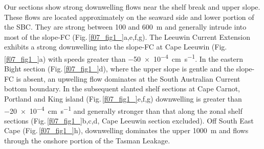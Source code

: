 \documentclass[preprint,3p,review,12pt]{elsarticle}
\begin{document}
Our sections show strong downwelling flows near the shelf break and upper slope. These flows are located approximately on the seaward side and lower portion of the SBC\@. They are strong between \num{100} and \SI{600}{\meter} and generally intrude into most of the slope-FC (Fig.\,\ref{f07_fig1_}a,e,f,g). The Leeuwin Current Extension exhibits a strong downwelling into the slope-FC at Cape Leeuwin (Fig.\,\ref{f07_fig1_}a) with speeds greater than \SI{-50 e-4}{\centi\meter\per\second}. In the eastern Bight section (Fig.\,\ref{f07_fig1_}d), where the upper slope is gentle and the slope-FC is absent, an upwelling flow dominates at the South Australian Current bottom boundary. In the subsequent slanted shelf sections at Cape Carnot, Portland and King island (Fig.\,\ref{f07_fig1_}e,f,g) downwelling is greater than \SI{-20 e-4}{\centi\meter\per\second} and generally stronger than that along the zonal shelf sections (Fig.\,\ref{f07_fig1_}b,c,d, Cape Leeuwin section excluded). Off South East Cape (Fig.\,\ref{f07_fig1_}h), downwelling dominates the upper \SI{1000}{\meter} and flows through the onshore portion of the Tasman Leakage.
%
\end{document}
